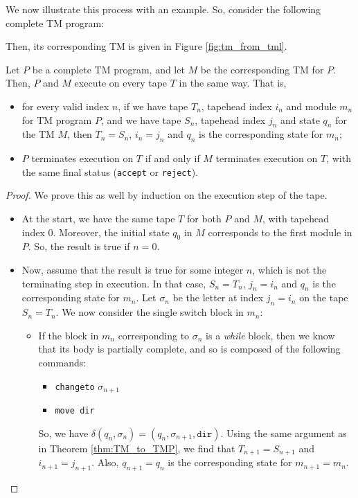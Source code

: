 \begin{appendices}
We now illustrate this process with an example. So, consider the following complete TM program:

Then, its corresponding TM is given in Figure \ref{fig:tm_from_tml}.
\begin{theorem}
    Let $P$ be a complete TM program, and let $M$ be the corresponding TM for $P$. Then, $P$ and $M$ execute on every tape $T$ in the same way. That is,
    \begin{itemize}
        \item for every valid index $n$, if we have tape $T_n$, tapehead index $i_n$ and module $m_n$ for TM program $P$, and we have tape $S_n$, tapehead index $j_n$ and state $q_n$ for the TM $M$, then $T_n = S_n$, $i_n = j_n$ and $q_n$ is the corresponding state for $m_n$;
        \item $P$ terminates execution on $T$ if and only if $M$ terminates execution on $T$, with the same final status (\texttt{accept} or \texttt{reject}).
    \end{itemize}
\end{theorem}
\begin{proof}
    We prove this as well by induction on the execution step of the tape. 
    \begin{itemize}
        \item At the start, we have the same tape $T$ for both $P$ and $M$, with tapehead index $0$. Moreover, the initial state $q_0$ in $M$ corresponds to the first module in $P$. So, the result is true if $n = 0$. 
        
        \item Now, assume that the result is true for some integer $n$, which is not the terminating step in execution. In that case, $S_n = T_n$, $j_n = i_n$ and $q_n$ is the corresponding state for $m_n$. Let $\sigma_n$ be the letter at index $j_n = i_n$ on the tape $S_n = T_n$. We now consider the single switch block in $m_n$:
        \begin{itemize}
            \item If the block in $m_n$ corresponding to $\sigma_n$ is a \textit{while} block, then we know that its body is partially complete, and so is composed of the following commands:
            \begin{itemize}
                \item \texttt{changeto} $\sigma_{n+1}$
                \item \texttt{move dir}
            \end{itemize}
            So, we have $\delta(q_n, \sigma_n) = (q_n, \sigma_{n+1}, \texttt{dir})$. Using the same argument as in Theorem \ref{thm:TM_to_TMP}, we find that $T_{n+1} = S_{n+1}$ and $i_{n+1} = j_{n+1}$. Also, $q_{n+1} = q_n$ is the corresponding state for $m_{n+1} = m_n$. 
            

\end{itemize}
\end{itemize}
\end{proof}
\end{appendices}
